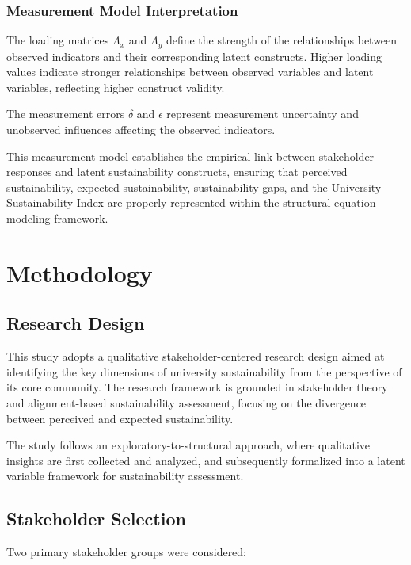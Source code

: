 \documentclass[11pt,a4paper]{article}
\begin{document}
\subsubsection{Measurement Model Interpretation}

The loading matrices $\Lambda_x$ and $\Lambda_y$ define the strength of the relationships between observed indicators and their corresponding latent constructs. Higher loading values indicate stronger relationships between observed variables and latent variables, reflecting higher construct validity.

The measurement errors $\delta$ and $\epsilon$ represent measurement uncertainty and unobserved influences affecting the observed indicators.

This measurement model establishes the empirical link between stakeholder responses and latent sustainability constructs, ensuring that perceived sustainability, expected sustainability, sustainability gaps, and the University Sustainability Index are properly represented within the structural equation modeling framework.



\section{Methodology}

\subsection{Research Design}

This study adopts a qualitative stakeholder-centered research design aimed at identifying the key dimensions of university sustainability from the perspective of its core community. The research framework is grounded in stakeholder theory and alignment-based sustainability assessment, focusing on the divergence between perceived and expected sustainability.

The study follows an exploratory-to-structural approach, where qualitative insights are first collected and analyzed, and subsequently formalized into a latent variable framework for sustainability assessment.

\subsection{Stakeholder Selection}

Two primary stakeholder groups were considered:
\end{document}

